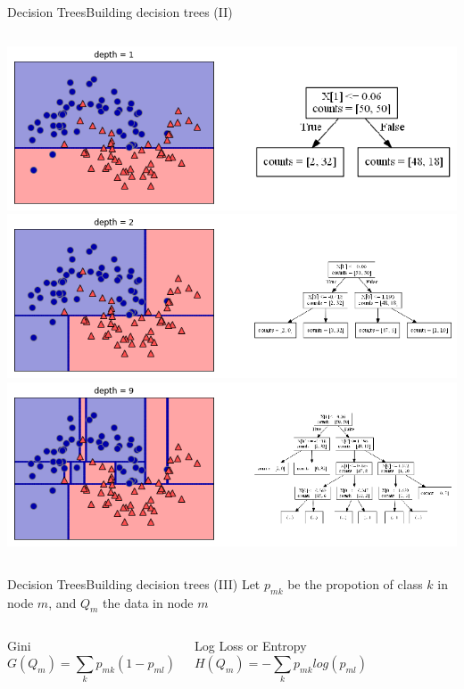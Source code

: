 \documentclass[10pt,compress]{beamer} %
\begin{document}
\begin{frame}[plain]{Decision Trees}{Building decision trees (II)}
    \begin{columns}
            \centering \includegraphics[width=\linewidth]{figs/tree-d1.png}
            \centering \includegraphics[width=\linewidth]{figs/tree-d2.png}
            \centering \includegraphics[width=\linewidth]{figs/tree-d9.png}
    \end{columns}
\end{frame}

\begin{frame}[plain]{Decision Trees}{Building decision trees (III)}
    Let $p_{mk}$ be the propotion of  class $k$ in node $m$, and $Q_m$ the data in node $m$

    \centering
    \bigskip

    \begin{columns}
        \centering Gini \\
        \begin{equation*}
            G(Q_m) = \sum_k p_{mk} (1 - p_{ml})
        \end{equation*}

        \centering Log Loss or Entropy
        \begin{equation*}
            H(Q_m) = - \sum_k p_{mk} log(p_{ml})
        \end{equation*}
    \end{columns}
\end{frame}
\end{document}
